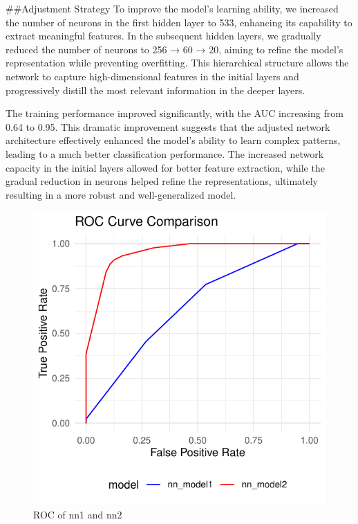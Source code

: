 \documentclass[
  12pt,
  letterpaper,
  DIV=11,
  numbers=noendperiod]{scrartcl}
\begin{document}
\#\#Adjustment Strategy To improve the model's learning ability, we
increased the number of neurons in the first hidden layer to 533,
enhancing its capability to extract meaningful features. In the
subsequent hidden layers, we gradually reduced the number of neurons to
256 → 60 → 20, aiming to refine the model's representation while
preventing overfitting. This hierarchical structure allows the network
to capture high-dimensional features in the initial layers and
progressively distill the most relevant information in the deeper
layers.

The training performance improved significantly, with the AUC increasing
from 0.64 to 0.95. This dramatic improvement suggests that the adjusted
network architecture effectively enhanced the model's ability to learn
complex patterns, leading to a much better classification performance.
The increased network capacity in the initial layers allowed for better
feature extraction, while the gradual reduction in neurons helped refine
the representations, ultimately resulting in a more robust and
well-generalized model.

\begin{figure}[H]

{\centering \includegraphics{me_files/figure-pdf/nnROC-1.pdf}

}

\caption{ROC of nn1 and nn2}

\end{figure}%
\end{document}
